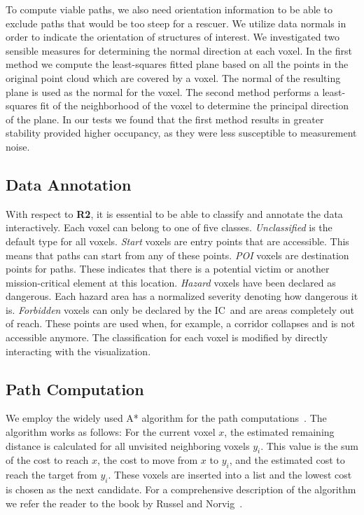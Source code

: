 \documentclass{egpubl}
\def\IC{IC}
\begin{document}
To compute viable paths, we also need orientation information to be able to exclude paths that would be too steep for a rescuer. We utilize data normals in order to indicate the orientation of structures of interest. We investigated two sensible measures for determining the normal direction at each voxel. In the first method we compute the least-squares fitted plane based on all the points in the original point cloud which are covered by a voxel. The normal of the resulting plane is used as the normal for the voxel. The second method performs a least-squares fit of the neighborhood of the voxel to determine the principal direction of the plane. In our tests we found that the first method results in greater stability provided higher occupancy, as they were less susceptible to measurement noise.


\subsection{Data Annotation} \label{sec:overview:annotation}
With respect to {\bfseries R2}, it is essential to be able to classify and annotate the data interactively. Each voxel can belong to one of five classes. \emph{Unclassified} is the default type for all voxels. \emph{Start} voxels are entry points that are accessible. This means that paths can start from any of these points. \emph{POI} voxels are destination points for paths. These indicates that there is a potential victim or another mission-critical element at this location. \emph{Hazard} voxels have been declared as dangerous. Each hazard area has a normalized severity denoting how dangerous it is. \emph{Forbidden} voxels can only be declared by the \IC\ and are areas completely out of reach. These points are used when, for example, a corridor collapses and is not accessible anymore. The classification for each voxel is modified by directly interacting with the visualization. 


\subsection{Path Computation} \label{sec:overview:pathcomputation}
We employ the widely used A* algorithm for the path computations~\cite{4082128}. The algorithm works as follows: For the current voxel $x$, the estimated remaining distance is calculated for all unvisited neighboring voxels $y_i$. This value is the sum of the cost to reach $x$, the cost to move from $x$ to $y_i$, and the estimated cost to reach the target from $y_i$. These voxels are inserted into a list and the lowest cost is chosen as the next candidate. For a comprehensive description of the algorithm we refer the reader to the book by Russel and Norvig~\cite{AStar}.
\end{document}

